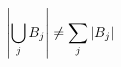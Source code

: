 \documentclass[preview]{standalone}
\begin{document}
\begin{align*}
\special{dvisvgm:raw <g id='unique000'>}\left|\bigcup_jB_j\right|\ne\sum_j|B_j|\special{dvisvgm:raw </g>}
\end{align*}
\end{document}
